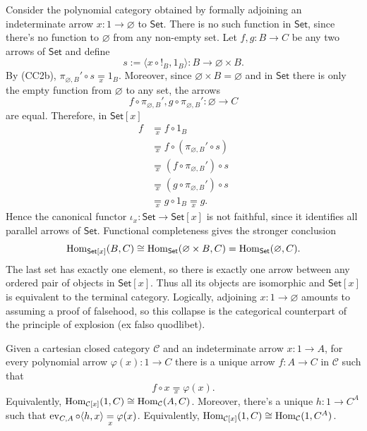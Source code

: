 \begin{example}\label{ex:collapse-of-set-x}
    Consider the polynomial category obtained by formally adjoining an indeterminate arrow $x : 1 \to \varnothing$ to $\mathsf{Set}$.
    There is no such function in $\mathsf{Set}$, since there's no function to $\varnothing$ from any non-empty set.
    Let $f,g : B \to C$ be any two arrows of $\mathsf{Set}$ and define
    \[ s := \langle x \circ !_B, 1_B\rangle : B \to \varnothing \times B. \]
    By (CC2b), $\pi_{\varnothing,B}' \circ s \underset{x}{=} 1_B$. Moreover, since $\varnothing \times B = \varnothing$ and in $\mathsf{Set}$ there is only the empty function from $\varnothing$ to any set, the arrows
    \[ f \circ \pi_{\varnothing,B}', g \circ \pi_{\varnothing,B}' : \varnothing \to C \]
    are equal. Therefore, in $\mathsf{Set}[x]$
    \begin{align*}
        f &\underset{x}{=} f \circ 1_B \\
          &\underset{x}{=} f \circ (\pi_{\varnothing,B}' \circ s) \\
          &\underset{x}{=} (f \circ \pi_{\varnothing,B}') \circ s \\
          &\underset{x}{=} (g \circ \pi_{\varnothing,B}') \circ s \\
          &\underset{x}{=} g \circ 1_B \underset{x}{=} g.
    \end{align*}
    Hence the canonical functor $\iota_x : \mathsf{Set} \to \mathsf{Set}[x]$ is not faithful, since it identifies all parallel arrows of $\mathsf{Set}$.
    Functional completeness gives the stronger conclusion
    \[ \operatorname{Hom}_{\mathsf{Set}[x]}(B,C) \cong \operatorname{Hom}_{\mathsf{Set}}(\varnothing \times B,C) = \operatorname{Hom}_{\mathsf{Set}}(\varnothing,C). \]
    The last set has exactly one element, so there is exactly one arrow between any ordered pair of objects in $\mathsf{Set}[x]$.
    Thus all its objects are isomorphic and $\mathsf{Set}[x]$ is equivalent to the terminal category. Logically, adjoining $x : 1 \to \varnothing$ amounts to assuming a proof of falsehood, so this collapse is the categorical counterpart of the principle of explosion (ex falso quodlibet).
\end{example}

\begin{corollary}\label{cor:lambeks-normal-form}
    Given a cartesian closed category $\mathcal C$ and an indeterminate arrow $x : 1 \to A$, for every polynomial arrow $\varphi(x) : 1 \to C$ there is a unique arrow $f : A \to C$ in $\mathcal C$ such that
    \[ f \circ x \underset{x}{=} \varphi(x). \]
    Equivalently, $\operatorname{Hom}_{\mathcal C[x]}(1,C) \cong \operatorname{Hom}_{\mathcal C}(A,C)$.
    Moreover, there's a unique $h : 1 \to C^A$ such that $\operatorname{ev}_{C,A} \circ \langle h,x \rangle \underset{x}{=} \varphi(x)$. Equivalently, $\operatorname{Hom}_{\mathcal C[x]}(1,C) \cong \operatorname{Hom}_{\mathcal C}(1,C^A)$.
\end{corollary}

